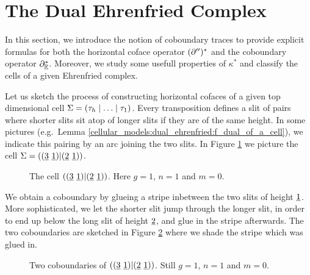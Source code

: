 \section{The Dual Ehrenfried Complex}
\label{cellular_models:dual_ehrenfried}
In this section, we introduce the notion of coboundary traces to provide explicit formulas for both the horizontal coface operator $(\partial'')^\ast$ and
the coboundary operator $\partial_\mathbb E^\ast$.
Moreover, we study some usefull properties of $\kappa^\ast$ and classify the cells of a given Ehrenfried complex.

Let us sketch the process of constructing horizontal cofaces of a given top dimensional cell $\Sigma = \inhom$.
Every transposition defines a slit of pairs where shorter slits sit atop of longer slits if they are of the same height.
In some pictures (e.g.\ Lemma \ref{cellular_models:dual_ehrenfried:f_dual_of_a_cell}), we indicate this pairing by an arc joining the two slits.
In Figure \ref{cellular_models:dual_ehrenfried:motivate_coboundaries_pre} we picture the cell $\Sigma = ((\ul3\ \ul1)|(\ul2\ \ul1))$.
\begin{figure}[ht]
\centering
{}
\caption{\label{cellular_models:dual_ehrenfried:motivate_coboundaries_pre}The cell $((\ul3\ \ul1)|(\ul2\ \ul1))$. Here $g=1$, $n=1$ and $m=0$.}
\end{figure}

We obtain a coboundary by glueing a stripe inbetween the two slits of height $\underline{\smash{1}}$.
More sophisticated, we let the shorter slit jump through the longer slit, in order to end up below the long slit of height $\underline{\smash{2}}$, and glue in the stripe afterwards.
The two coboundaries are sketched in Figure \ref{cellular_models:dual_ehrenfried:motivate_coboundaries} where we shade the stripe which was glued in.
\begin{figure}[ht]
\centering
{}
\caption{\label{cellular_models:dual_ehrenfried:motivate_coboundaries}Two coboundaries of $((\ul3\ \ul1)|(\ul2\ \ul1))$. Still $g=1$, $n=1$ and $m=0$.}
\end{figure}

